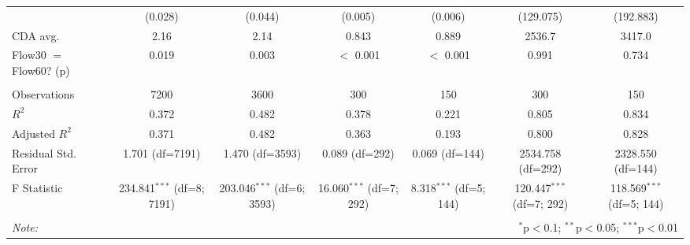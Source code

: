 \begin{table}[!htbp]
\begin{tabular}{@{\extracolsep{5pt}}lcccccc}
& (0.028) & (0.044) & (0.005) & (0.006) & (129.075) & (192.883) \\
 CDA avg. & 2.16 & 2.14 & 0.843 & 0.889 & 2536.7 & 3417.0 \\
 Flow30 $=$ Flow60? (p) & 0.019 & 0.003 & $<$ 0.001 & $<$ 0.001 & 0.991 & 0.734 \\
\hline \\[-1.8ex]
 Observations & 7200 & 3600 & 300 & 150 & 300 & 150 \\
 $R^2$ & 0.372 & 0.482 & 0.378 & 0.221 & 0.805 & 0.834 \\
 Adjusted $R^2$ & 0.371 & 0.482 & 0.363 & 0.193 & 0.800 & 0.828 \\
 Residual Std. Error & 1.701 (df=7191) & 1.470 (df=3593) & 0.089 (df=292) & 0.069 (df=144) & 2534.758 (df=292) & 2328.550 (df=144) \\
 F Statistic & 234.841$^{***}$ (df=8; 7191) & 203.046$^{***}$ (df=6; 3593) & 16.060$^{***}$ (df=7; 292) & 8.318$^{***}$ (df=5; 144) & 120.447$^{***}$ (df=7; 292) & 118.569$^{***}$ (df=5; 144) \\
\hline
\hline \\[-1.8ex]
\textit{Note:} & \multicolumn{6}{r}{$^{*}$p$<$0.1; $^{**}$p$<$0.05; $^{***}$p$<$0.01} \\
\end{tabular}
\end{table}